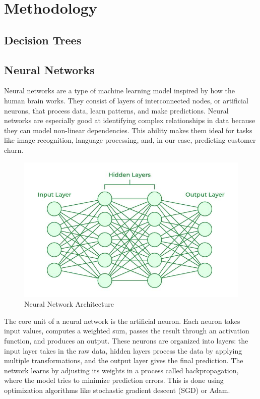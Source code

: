\section{Methodology}
\subsection{Decision Trees}
\subsection{Neural Networks}
Neural networks are a type of machine learning model inspired by how the human brain works. They consist of layers of interconnected nodes, or artificial neurons, that process data, learn patterns, and make predictions. Neural networks are especially good at identifying complex relationships in data because they can model non-linear dependencies. This ability makes them ideal for tasks like image recognition, language processing, and, in our case, predicting customer churn.\\

\begin{figure}[hbt!]
    \centering
    \includegraphics[width=1\linewidth]{Images/3.2.a.jpg}
    \caption{Neural Network Architecture }
    \label{fig:enter-label}
\end{figure}

The core unit of a neural network is the artificial neuron. Each neuron takes input values, computes a weighted sum, passes the result through an activation function, and produces an output. These neurons are organized into layers: the input layer takes in the raw data, hidden layers process the data by applying multiple transformations, and the output layer gives the final prediction. The network learns by adjusting its weights in a process called backpropagation, where the model tries to minimize prediction errors. This is done using optimization algorithms like stochastic gradient descent (SGD) or Adam.\\

